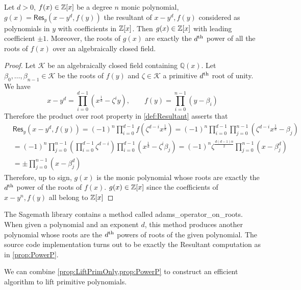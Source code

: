 \begin{proposition} \label{prop:PowerP}
    Let \(d > 0\), \(f(x) \in \mathbb{Z}[x]\) be a degree \(n\) monic polynomial, \(g(x) = \mathsf{Res}_y(x - y^d, f(y))\) the resultant of \(x - y^d, f(y)\) considered as polynomials in \(y\) with coefficients in \(\mathbb{Z}[x]\). Then \(g(x) \in \mathbb{Z}[x]\) with leading coefficient \(\pm 1\). Moreover, the roots of \(g(x)\) are exactly the \(d\textsuperscript{th}\) power of all the roots of \(f(x)\) over an algebraically closed field.
\end{proposition}
\begin{proof}
    Let \(\mathcal{K}\) be an algebraically closed field containing \(\mathbb{Q}(x)\). Let \(\beta_0, \ldots, \beta_{n-1} \in \mathcal{K}\) be the roots of \(f(y)\) and \(\zeta \in \mathcal{K}\) a primitive \(d\textsuperscript{th}\) root of unity. We have
    \[ x - y^d = \prod_{i=0}^{d-1} (x^{\frac{1}{d}} - \zeta^i y), \qquad 
    f(y) = \prod_{i=0}^{n-1} (y - \beta_i) \]
    Therefore the product over root property in \cref{def:Resultant} asserts that
    \begin{align*}
        &\mathsf{Res}_y(x-y^d, f(y)) = (-1)^n \prod_{i=0}^{d-1} f(\zeta^{d-i} x^{\frac{1}{d}}) = (-1)^n \prod_{i=0}^{d-1} \prod_{j=0}^{n-1}(\zeta^{d-i} x^{\frac{1}{d}} - \beta_j) \\
        &= (-1)^n \prod_{j=0}^{n-1}\left(\prod_{i=0}^{d-1}\zeta^{d-i}\right)\prod_{i=0}^{d-1}(x^{\frac{1}{d}} - \zeta^i \beta_j) = (-1)^n \zeta^{\frac{d(d-1)n}{2}} \prod_{j=0}^{n-1} (x - \beta_j^d) \\
        &= \pm \prod_{j=0}^{n-1}(x - \beta_j^d)
    \end{align*}
    Therefore, up to sign, \(g(x)\) is the monic polynomial whose roots are exactly the \(d\textsuperscript{th}\) power of the roots of \(f(x)\). \(g(x) \in \mathbb{Z}[x]\) since the coefficients of \(x - y^n, f(y)\) all belong to \(\mathbb{Z}[x]\)
\end{proof}

\begin{remark}
    The Sagemath library contains a method called adams\_operator\_on\_roots. When given a polynomial and an exponent \(d\), this method produces another polynomial whose roots are the \(d\textsuperscript{th}\) powers of roots of the given polynomial. The source code implementation turns out to be exactly the Resultant computation as in \cref{prop:PowerP}.
\end{remark}

We can combine \cref{prop:LiftPrimOnly,prop:PowerP} to construct an efficient algorithm to lift primitive polynomials.

